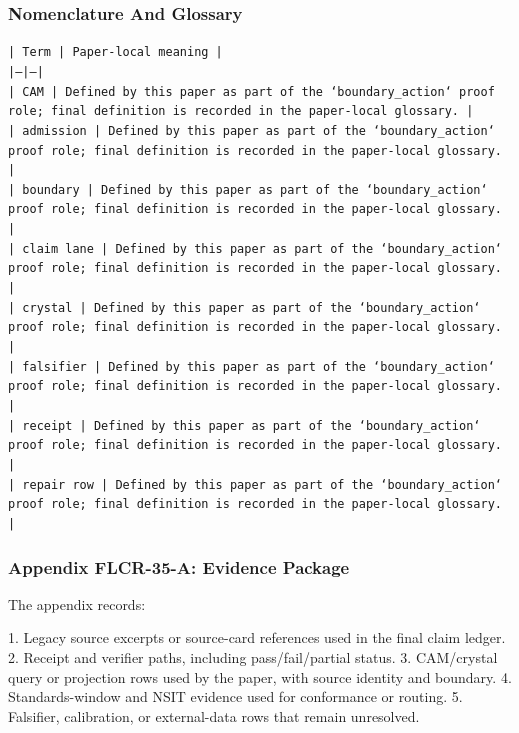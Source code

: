 \documentclass[11pt]{article}
\begin{document}
\subsubsection*{Nomenclature And Glossary}

\noindent\texttt{| Term | Paper-local meaning |}\\
\noindent\texttt{|---|---|}\\
\noindent\texttt{| CAM | Defined by this paper as part of the `boundary\_action` proof role; final definition is recorded in the paper-local glossary. |}\\
\noindent\texttt{| admission | Defined by this paper as part of the `boundary\_action` proof role; final definition is recorded in the paper-local glossary. |}\\
\noindent\texttt{| boundary | Defined by this paper as part of the `boundary\_action` proof role; final definition is recorded in the paper-local glossary. |}\\
\noindent\texttt{| claim lane | Defined by this paper as part of the `boundary\_action` proof role; final definition is recorded in the paper-local glossary. |}\\
\noindent\texttt{| crystal | Defined by this paper as part of the `boundary\_action` proof role; final definition is recorded in the paper-local glossary. |}\\
\noindent\texttt{| falsifier | Defined by this paper as part of the `boundary\_action` proof role; final definition is recorded in the paper-local glossary. |}\\
\noindent\texttt{| receipt | Defined by this paper as part of the `boundary\_action` proof role; final definition is recorded in the paper-local glossary. |}\\
\noindent\texttt{| repair row | Defined by this paper as part of the `boundary\_action` proof role; final definition is recorded in the paper-local glossary. |}\\

\subsubsection*{Appendix FLCR-35-A: Evidence Package}

The appendix records:

1. Legacy source excerpts or source-card references used in the final claim ledger.
2. Receipt and verifier paths, including pass/fail/partial status.
3. CAM/crystal query or projection rows used by the paper, with source identity and boundary.
4. Standards-window and NSIT evidence used for conformance or routing.
5. Falsifier, calibration, or external-data rows that remain unresolved.
\end{document}
